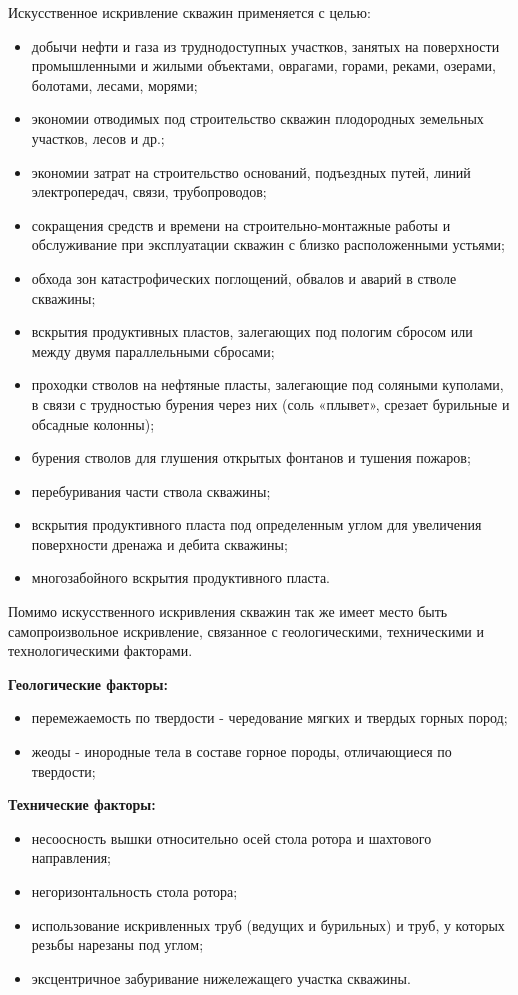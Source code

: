 Искусственное искривление скважин применяется с целью:
\begin{itemize}
  \item добычи нефти и газа из труднодоступных участков, занятых на поверхности промышленными и жилыми объектами, оврагами, горами, реками, озерами, болотами, лесами, морями;
  \item экономии отводимых под строительство скважин плодородных земельных участков, лесов и др.;
  \item экономии затрат на строительство оснований, подъездных путей, линий электропередач, связи, трубопроводов;
  \item сокращения средств и времени на строительно-монтажные работы и обслуживание при эксплуатации скважин с близко расположенными устьями;
  \item обхода зон катастрофических поглощений, обвалов и аварий в стволе скважины;
  \item вскрытия продуктивных пластов, залегающих под пологим сбросом или между двумя параллельными сбросами;
  \item проходки стволов на нефтяные пласты, залегающие под соляными куполами, в связи с трудностью бурения через них (соль «плывет», срезает бурильные и обсадные колонны);
  \item бурения стволов для глушения открытых фонтанов и тушения пожаров;
  \item перебуривания части ствола скважины;
  \item вскрытия продуктивного пласта под определенным углом для увеличения поверхности дренажа и дебита скважины;
  \item многозабойного вскрытия продуктивного пласта.
\end{itemize}

Помимо искусственного искривления скважин так же имеет место быть самопроизвольное искривление, связанное с геологическими, техническими и технологическими факторами.

\textbf{Геологические факторы:}
\begin{itemize}
  \item перемежаемость по твердости - чередование мягких и твердых горных пород;
  \item жеоды - инородные тела в составе горное породы, отличающиеся по твердости;
\end{itemize}

\textbf{Технические факторы:}
\begin{itemize}
  \item несоосность вышки  относительно осей стола ротора  и шахтового направления;
  \item негоризонтальность стола ротора;
  \item использование искривленных труб (ведущих и бурильных) и труб, у которых резьбы нарезаны под углом;
  \item эксцентричное забуривание нижележащего участка скважины.
\end{itemize}

